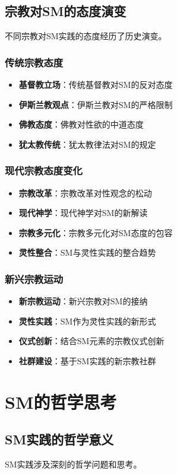 \documentclass[12pt,UTF8]{ctexbook}
\begin{document}
\section{宗教对SM的态度演变}
不同宗教对SM实践的态度经历了历史演变。

\subsection{传统宗教态度}
\begin{itemize}[leftmargin=2cm]
	\item \textbf{基督教立场}：传统基督教对SM的反对态度
	\item \textbf{伊斯兰教观点}：伊斯兰教对SM的严格限制
	\item \textbf{佛教态度}：佛教对性欲的中道态度
	\item \textbf{犹太教传统}：犹太教律法对SM的规定
\end{itemize}

\subsection{现代宗教态度变化}
\begin{itemize}[leftmargin=2cm]
	\item \textbf{宗教改革}：宗教改革对性观念的松动
	\item \textbf{现代神学}：现代神学对SM的新解读
	\item \textbf{宗教多元化}：宗教多元化对SM态度的包容
	\item \textbf{灵性整合}：SM与灵性实践的整合趋势
\end{itemize}

\subsection{新兴宗教运动}
\begin{itemize}[leftmargin=2cm]
	\item \textbf{新宗教运动}：新兴宗教对SM的接纳
	\item \textbf{灵性实践}：SM作为灵性实践的新形式
	\item \textbf{仪式创新}：结合SM元素的宗教仪式创新
	\item \textbf{社群建设}：基于SM实践的新宗教社群
\end{itemize}

\chapter{SM的哲学思考}
\section{SM实践的哲学意义}
SM实践涉及深刻的哲学问题和思考。
\end{document}

